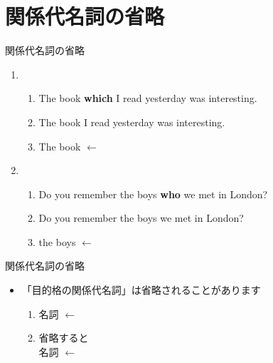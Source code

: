 \documentclass[aspectratio=169,xcolor={dvipsnames,table}]{beamer}
\begin{document}
\section{関係代名詞の省略}
\begin{frame}[plain,t]{関係代名詞の省略}

\begin{enumerate}
 \item \begin{enumerate}
	\item The book \textbf{which} I read yesterday was interesting.
	\item The book I read yesterday was interesting.
	\item The book $\longleftarrow$ 
       \end{enumerate}
 \item \begin{enumerate}
	\item Do you remember the boys \textbf{who} we met in London?
	\item Do you remember the boys we met in London?
	\item the boys $\longleftarrow$ 
       \end{enumerate}
\end{enumerate}

\begin{block}{関係代名詞の省略}
\small
\begin{itemize}[square]
 \item  \<「目的格の関係代名詞」は省略されることがあります
\begin{enumerate}\small{}[circle]
 \item<1->  \hspace{50pt}名詞\,\,$\longleftarrow$\,\,
 \item<1->  省略すると\\
\hspace{50pt}名詞\,\,$\longleftarrow$\,\,
 \end{enumerate}
\end{itemize}
     \end{block}
\end{frame}
\end{document}

